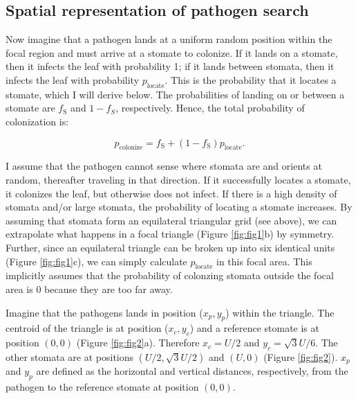 \documentclass[utf8]{frontiersSCNS}
\newcommand{\fs}{$f_\text{S}$}
\begin{document}
\hypertarget{spatial-representation-of-pathogen-search}{%
\subsection*{Spatial representation of pathogen
search}\label{spatial-representation-of-pathogen-search}}

Now imagine that a pathogen lands at a uniform random position within
the focal region and must arrive at a stomate to colonize. If it lands
on a stomate, then it infects the leaf with probability 1; if it lands
between stomata, then it infects the leaf with probability
\(p_\text{locate}\). This is the probability that it locates a stomate,
which I will derive below. The probabilities of landing on or between a
stomate are \fs{} and \(1 - f_S\), respectively. Hence, the total
probability of colonization is:

\begin{equation}
  \label{eq:p_colonize}
  p_\text{colonize} = f_\text{S} + (1 - f_\text{S}) p_\text{locate}.
\end{equation}

I assume that the pathogen cannot sense where stomata are and orients at
random, thereafter traveling in that direction. If it successfully
locates a stomate, it colonizes the leaf, but otherwise does not infect.
If there is a high density of stomata and/or large stomata, the
probability of locating a stomate increases. By assuming that stomata
form an equilateral triangular grid (see above), we can extrapolate what
happens in a focal triangle (Figure \ref{fig:fig1}b) by symmetry.
Further, since an equilateral triangle can be broken up into six
identical units (Figure \ref{fig:fig1}c), we can simply calculate
\(p_\text{locate}\) in this focal area. This implicitly assumes that the
probability of colonzing stomata outside the focal area is 0 because
they are too far away.

Imagine that the pathogens lands in position (\(x_p,y_p\)) within the
triangle. The centroid of the triangle is at position (\(x_c,y_c\)) and
a reference stomate is at position \((0,0)\) (Figure \ref{fig:fig2}a).
Therefore \(x_c = U / 2\) and \(y_c = \sqrt{3} U / 6\). The other
stomata are at positions \((U/2, \sqrt{3} U /2)\) and \((U,0)\) (Figure
\ref{fig:fig2}). \(x_p\) and \(y_p\) are defined as the horizontal and
vertical distances, respectively, from the pathogen to the reference
stomate at position \((0,0)\).
\end{document}
